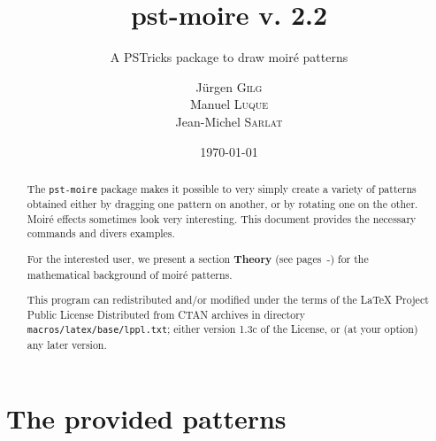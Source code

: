\documentclass[%
    11pt,
    english,
    BCOR10mm,
    DIV12,
    bibliography=totoc,
    parskip=false,
    fleqn,
    smallheadings,
    headexclude,
    footexclude,
    oneside,
    dvipsnames,
    svgnames,
    x11names
]{pst-doc}
\begin{document}
\title{pst-moire v. 2.2}
\subtitle{A PSTricks package to draw moiré patterns}
\author{%
    Jürgen \textsc{Gilg}\\
    Manuel \textsc{Luque}\\
    Jean-Michel \textsc{Sarlat}
}

\date{\today}
\maketitle
\tableofcontents
{}

\clearpage

\begin{abstract}\parskip4pt\parindent0pt

The \texttt{pst-moire} package makes it possible to very simply create a variety of patterns obtained either by dragging one pattern on another, or by rotating one on the other. Moiré effects sometimes look very interesting. This document provides the necessary commands and divers examples.

For the interested user, we present a section \textbf{Theory} (see pages~\pageref{sec:theory}-\pageref{sec:theoryEnd}) for the mathematical background of moiré patterns.

\vfill
{\small This program can redistributed and/or modified under the terms of the LaTeX Project Public License Distributed from CTAN archives in directory \texttt{macros/latex/base/lppl.txt}; either version 1.3c of the License, or (at your option) any later version.}

\end{abstract}


\newpage


\section{The provided patterns}
\end{document}
